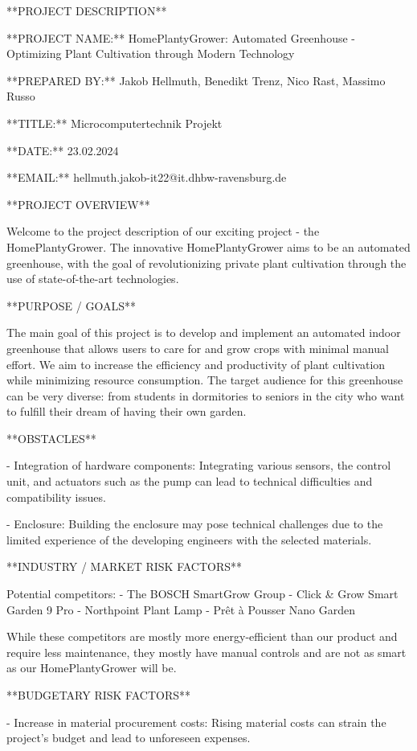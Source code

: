 **PROJECT DESCRIPTION**

**PROJECT NAME:** HomePlantyGrower: Automated Greenhouse - Optimizing Plant Cultivation through Modern Technology

**PREPARED BY:** Jakob Hellmuth, Benedikt Trenz, Nico Rast, Massimo Russo

**TITLE:** Microcomputertechnik Projekt

**DATE:** 23.02.2024

**EMAIL:** hellmuth.jakob-it22@it.dhbw-ravensburg.de

**PROJECT OVERVIEW**

Welcome to the project description of our exciting project - the HomePlantyGrower. The innovative HomePlantyGrower aims to be an automated greenhouse, with the goal of revolutionizing private plant cultivation through the use of state-of-the-art technologies.

**PURPOSE / GOALS**

The main goal of this project is to develop and implement an automated indoor greenhouse that allows users to care for and grow crops with minimal manual effort. We aim to increase the efficiency and productivity of plant cultivation while minimizing resource consumption. The target audience for this greenhouse can be very diverse: from students in dormitories to seniors in the city who want to fulfill their dream of having their own garden.

**OBSTACLES**

- Integration of hardware components: Integrating various sensors, the control unit, and actuators such as the pump can lead to technical difficulties and compatibility issues.
  
- Enclosure: Building the enclosure may pose technical challenges due to the limited experience of the developing engineers with the selected materials.

**INDUSTRY / MARKET RISK FACTORS**

Potential competitors:
- The BOSCH SmartGrow Group
- Click & Grow Smart Garden 9 Pro
- Northpoint Plant Lamp
- Prêt à Pousser Nano Garden

While these competitors are mostly more energy-efficient than our product and require less maintenance, they mostly have manual controls and are not as smart as our HomePlantyGrower will be.

**BUDGETARY RISK FACTORS**

- Increase in material procurement costs: Rising material costs can strain the project's budget and lead to unforeseen expenses.
  
